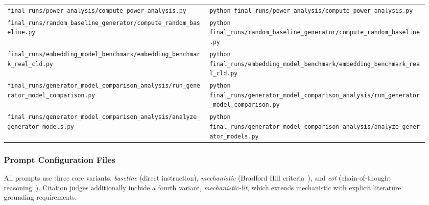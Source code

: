 \begin{table}[H]
\begin{tabularx}{\textwidth}{@{}l X@{}}
\texttt{final\_runs/power\_analysis/compute\_power\_analysis.py} & \texttt{python final\_runs/power\_analysis/compute\_power\_analysis.py} \\
\texttt{final\_runs/random\_baseline\_generator/compute\_random\_baseline.py} & \texttt{python final\_runs/random\_baseline\_generator/compute\_random\_baseline.py} \\
\texttt{final\_runs/embedding\_model\_benchmark/embedding\_benchmark\_real\_cld.py} & \texttt{python final\_runs/embedding\_model\_benchmark/embedding\_benchmark\_real\_cld.py} \\
\texttt{final\_runs/generator\_model\_comparison\_analysis/run\_generator\_model\_comparison.py} & \texttt{python final\_runs/generator\_model\_comparison\_analysis/run\_generator\_model\_comparison.py} \\
\texttt{final\_runs/generator\_model\_comparison\_analysis/analyze\_generator\_models.py} & \texttt{python final\_runs/generator\_model\_comparison\_analysis/analyze\_generator\_models.py} \\
\bottomrule
\end{tabularx}
\end{table}

\subsubsection{Prompt Configuration Files}

All prompts use three core variants: \textit{baseline} (direct instruction), \textit{mechanistic} (Bradford Hill criteria~\cite{shimonovich2020bradford}), and \textit{cot} (chain-of-thought reasoning~\cite{kojima2022large}). Citation judges additionally include a fourth variant, \textit{mechanistic-lit}, which extends mechanistic with explicit literature grounding requirements.

